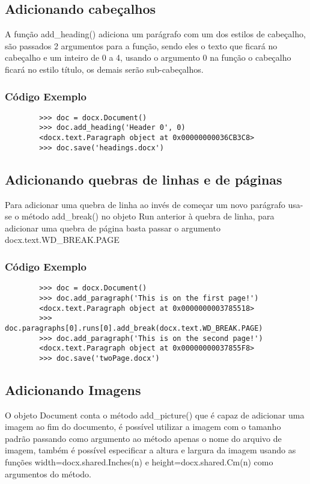 \documentclass[12pt,a4paper,article]{report}
\begin{document}
\subsection{Adicionando cabeçalhos}
    A função add\_heading() adiciona um parágrafo com um dos estilos de cabeçalho, são passados 2 argumentos para a função, sendo eles o texto que ficará no cabeçalho e um inteiro de 0 a 4, usando o argumento 0 na função o cabeçalho ficará no estilo título, os demais serão sub-cabeçalhos.
    
\subsubsection{Código Exemplo}
    \begin{verbatim}
        >>> doc = docx.Document() 
        >>> doc.add_heading('Header 0', 0) 
        <docx.text.Paragraph object at 0x00000000036CB3C8>
        >>> doc.save('headings.docx')
    \end{verbatim}
    
\subsection{Adicionando quebras de linhas e de páginas}
    Para adicionar uma quebra de linha ao invés de começar um novo parágrafo usa-se o método add\_break() no objeto Run anterior à quebra de linha, para adicionar uma quebra de página basta passar o argumento docx.text.WD\_BREAK.PAGE
    
\subsubsection{Código Exemplo}
    \begin{verbatim}
        >>> doc = docx.Document()
        >>> doc.add_paragraph('This is on the first page!') 
        <docx.text.Paragraph object at 0x0000000003785518> 
        >>> doc.paragraphs[0].runs[0].add_break(docx.text.WD_BREAK.PAGE)
        >>> doc.add_paragraph('This is on the second page!') 
        <docx.text.Paragraph object at 0x00000000037855F8> 
        >>> doc.save('twoPage.docx')
    \end{verbatim}
    
\subsection{Adicionando Imagens}
    O objeto Document conta o método add\_picture() que é capaz de adicionar uma imagem ao fim do documento, é possível utilizar a imagem com o tamanho padrão passando como argumento ao método apenas  o nome do arquivo de imagem, também é possível especificar a altura e largura da imagem usando as funções width=docx.shared.Inches(n) e
    height=docx.shared.Cm(n) como argumentos do método.
    
\end{document}
